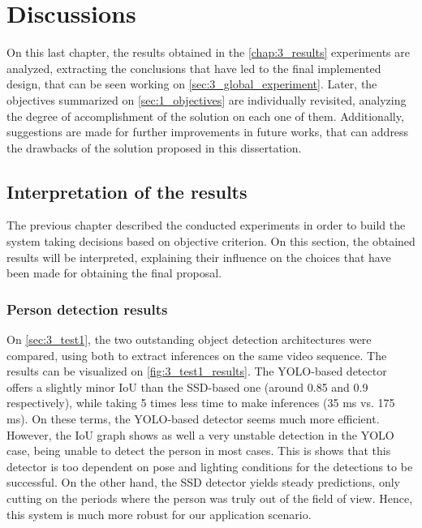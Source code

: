 \chapter{Discussions}
\label{chap:4_discussions}

On this last chapter, the results obtained in the \autoref{chap:3_results} experiments are analyzed, extracting the conclusions that have led to the final implemented design, that can be seen working on \autoref{sec:3_global_experiment}. Later, the objectives summarized on \autoref{sec:1_objectives} are individually revisited, analyzing the degree of accomplishment of the solution on each one of them. Additionally, suggestions are made for further improvements in future works, that can address the drawbacks of the solution proposed in this dissertation.


\section{Interpretation of the results}
The previous chapter described the conducted experiments in order to build the system taking decisions based on objective criterion. On this section, the obtained results will be interpreted, explaining their influence on the choices that have been made for obtaining the final proposal.

\subsection{Person detection results}

On \autoref{sec:3_test1}, the two outstanding object detection architectures were compared, using both to extract inferences on the same video sequence. The results can be visualized on \autoref{fig:3_test1_results}. The YOLO-based detector offers a slightly minor IoU than the SSD-based one (around 0.85 and 0.9 respectively), while taking 5 times less time to make inferences (35 ms vs. 175 ms). On these terms, the YOLO-based detector seems much more efficient. However, the IoU graph shows as well a very unstable detection in the YOLO case, being unable to detect the person in most cases. This is shows that this detector is too dependent on pose and lighting conditions for the detections to be successful. On the other hand, the SSD detector yields steady predictions, only cutting on the periods where the person was truly out of the field of view. Hence, this system is much more robust for our application scenario.\\


